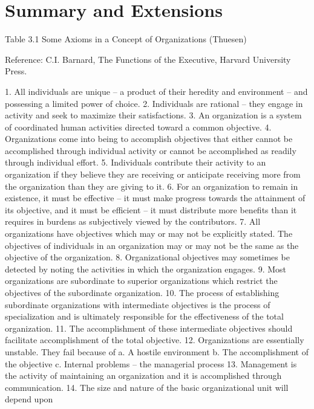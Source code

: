 \section{Summary and Extensions}

Table 3.1 Some Axioms in a Concept of Organizations (Thuesen)

Reference: C.I. Barnard, The Functions of the Executive, Harvard University Press.

    1. All individuals are unique – a product of their heredity and environment – and possessing a limited power of choice.
    2. Individuals are rational – they engage in activity and seek to maximize their satisfactions.
    3. An organization is a system of coordinated human activities directed toward a common objective.
    4. Organizations come into being to accomplish objectives that either cannot be accomplished through individual activity or cannot be accomplished as readily through individual effort.
    5. Individuals contribute their activity to an organization if they believe they are receiving or anticipate receiving more from the organization than they are giving to it.
    6. For an organization to remain in existence, it must be effective – it must make progress towards the attainment of its objective, and it must be efficient – it must distribute more benefits than it requires in burdens as subjectively viewed by the contributors.
    7. All organizations have objectives which may or may not be explicitly stated. The objectives of individuals in an organization may or may not be the same as the objective of the organization.
    8. Organizational objectives may sometimes be detected by noting the activities in which the organization engages.
    9. Most organizations are subordinate to superior organizations which restrict the objectives of the subordinate organization.
    10. The process of establishing subordinate organizations with intermediate objectives is the process of specialization and is ultimately responsible for the effectiveness of the total organization.
    11. The accomplishment of these intermediate objectives should facilitate accomplishment of the total objective.
    12. Organizations are essentially unstable. They fail because of 
        a. A hostile environment
        b. The accomplishment of the objective
        c. Internal problems – the managerial process
    13. Management is the activity of maintaining an organization and it is accomplished through communication.
    14. The size and nature of the basic organizational unit will depend upon
